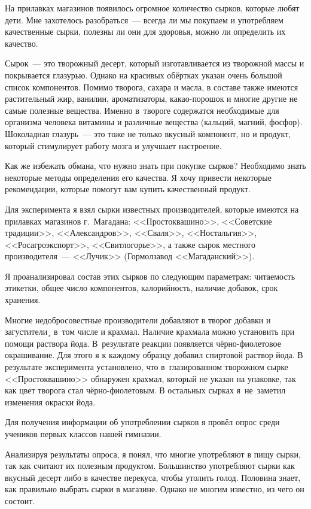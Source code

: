 На прилавках магазинов появилось огромное количество сырков, которые любят дети. Мне захотелось разобраться~--- всегда ли мы покупаем и употребляем качественные сырки, полезны ли они для здоровья, можно ли определить их качество.

Сырок~---  это творожный десерт, который изготавливается из творожной массы и покрывается глазурью. Однако на красивых обёртках указан очень большой список компонентов. Помимо творога, сахара и масла, в составе также имеются растительный жир, ванилин, ароматизаторы, какао-порошок и многие другие не самые полезные вещества. Именно в~твороге содержатся необходимые для организма человека витамины и различные вещества (кальций, магний, фосфор). Шоколадная глазурь~--- это тоже не только вкусный компонент, но и продукт, который стимулирует работу мозга и улучшает настроение.

Как же избежать обмана, что нужно знать при покупке сырков? Необходимо знать некоторые методы определения его качества. Я  хочу привести  некоторые рекомендации, которые помогут вам купить качественный продукт.

Для эксперимента я взял сырки известных производителей, которые имеются на прилавках магазинов г.~Магадана: <<Простоквашино>>, <<Советские традиции>>, <<Александров>>, <<Сваля>>, <<Ностальгия>>, <<Росагроэкспорт>>, <<Свитлогорье>>, а также сырок местного производителя~--- <<Лучик>> (Гормолзавод <<Магаданский>>).

Я проанализировал состав этих сырков по следующим параметрам: читаемость этикетки, общее число компонентов, калорийность, наличие добавок, срок хранения.

Многие недобросовестные производители добавляют в творог добавки и загустители¸ в~том числе и крахмал. Наличие крахмала можно установить при помощи раствора йода. В~результате реакции появляется чёрно-фиолетовое окрашивание. Для этого я к каждому образцу добавил спиртовой раствор йода. В результате эксперимента установлено, что в~глазированном творожном сырке <<Простоквашино>> обнаружен крахмал, который не указан на упаковке, так как цвет творога стал чёрно-фиолетовым. В остальных сырках я~не~заметил изменения окраски йода.

Для получения информации об употреблении сырков я провёл опрос среди учеников первых классов нашей гимназии.

Анализируя результаты опроса, я понял, что многие употребляют в пищу сырки, так как считают их полезным продуктом. Большинство употребляют сырки как вкусный десерт либо в качестве перекуса, чтобы утолить голод. Половина знает, как правильно выбрать сырки в магазине. Однако не многим известно, из чего он состоит.

